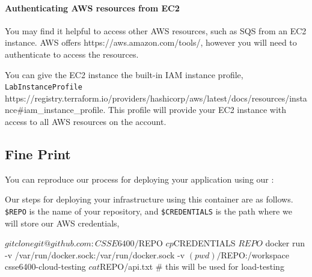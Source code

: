 \documentclass{csse4400}
\begin{document}

\paragraph{Authenticating AWS resources from EC2}
You may find it helpful to access other AWS resources,
such as SQS from an EC2 instance.
AWS offers %
{https://aws.amazon.com/tools/},
however you will need to authenticate to access the resources.

You can give the EC2 instance the built-in IAM instance profile,
\texttt{LabInstanceProfile} %
{https://registry.terraform.io/providers/hashicorp/aws/latest/docs/resources/instance\#iam_instance_profile}.
This profile will provide your EC2 instance with access to all AWS resources on the account.


\subsection{Fine Print}
You can reproduce our process for deploying your application using our :

Our steps for deploying your infrastructure using this container are as follows.
\texttt{\$REPO} is the name of your repository, and
\texttt{\$CREDENTIALS} is the path where we will store our AWS credentials,
\begin{code}[language=shell]{}
$ git clone git@github.com:CSSE6400/$REPO
$ cp $CREDENTIALS $REPO
$ docker run -v /var/run/docker.sock:/var/run/docker.sock -v $(pwd)/$REPO:/workspace csse6400-cloud-testing
$ cat $REPO/api.txt # this will be used for load-testing
\end{code}
\end{document}
